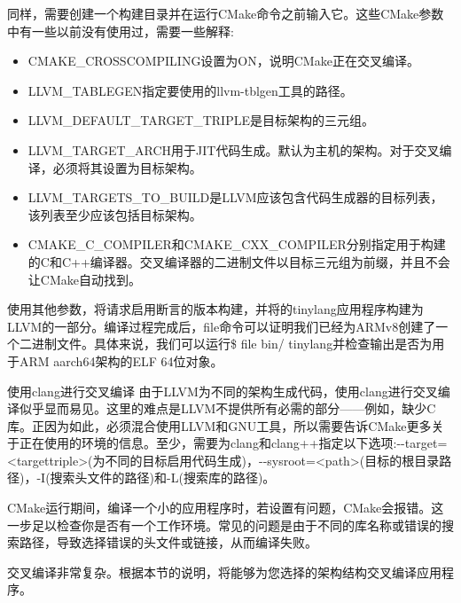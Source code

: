 同样，需要创建一个构建目录并在运行CMake命令之前输入它。这些CMake参数中有一些以前没有使用过，需要一些解释:

\begin{itemize}
\item
CMAKE\_CROSSCOMPILING设置为ON，说明CMake正在交叉编译。

\item
LLVM\_TABLEGEN指定要使用的llvm-tblgen工具的路径。

\item
LLVM\_DEFAULT\_TARGET\_TRIPLE是目标架构的三元组。

\item
LLVM\_TARGET\_ARCH用于JIT代码生成。默认为主机的架构。对于交叉编译，必须将其设置为目标架构。

\item
LLVM\_TARGETS\_TO\_BUILD是LLVM应该包含代码生成器的目标列表，该列表至少应该包括目标架构。

\item
CMAKE\_C\_COMPILER和CMAKE\_CXX\_COMPILER分别指定用于构建的C和C++编译器。交叉编译器的二进制文件以目标三元组为前缀，并且不会让CMake自动找到。
\end{itemize}

使用其他参数，将请求启用断言的版本构建，并将的tinylang应用程序构建为LLVM的一部分。编译过程完成后，file命令可以证明我们已经为ARMv8创建了一个二进制文件。具体来说，我们可以运行\$ file bin/ tinylang并检查输出是否为用于ARM aarch64架构的ELF 64位对象。

\begin{myTip}{使用clang进行交叉编译}
由于LLVM为不同的架构生成代码，使用clang进行交叉编译似乎显而易见。这里的难点是LLVM不提供所有必需的部分——例如，缺少C库。正因为如此，必须混合使用LLVM和GNU工具，所以需要告诉CMake更多关于正在使用的环境的信息。至少，需要为clang和clang++指定以下选项:-{}-target=<targettriple>(为不同的目标启用代码生成)，-{}-sysroot=<path>(目标的根目录路径)，-I(搜索头文件的路径)和-L(搜索库的路径)。

CMake运行期间，编译一个小的应用程序时，若设置有问题，CMake会报错。这一步足以检查你是否有一个工作环境。常见的问题是由于不同的库名称或错误的搜索路径，导致选择错误的头文件或链接，从而编译失败。
\end{myTip}

交叉编译非常复杂。根据本节的说明，将能够为您选择的架构结构交叉编译应用程序。

























